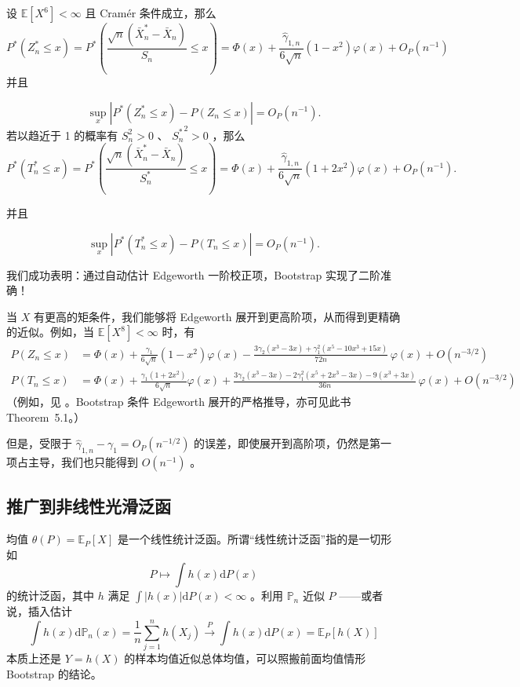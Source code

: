 \begin{theorem}\label{thm:ch11:second-order-accuracy}

设 $\mathbb E[X^6]<\infty$ 且 Cramér 条件成立，那么
\[P^*(Z_n^*\le x)=P^*\left(\frac{\sqrt n(\bar X_n^*-\bar X_n)}{S_n}\le x\right)=\Phi(x)+\frac{\widehat\gamma_{1,n}}{6\sqrt n}(1-x^2)\varphi(x)+O_P(n^{-1})\]
并且

\[
\sup_x \left| P^*(Z_n^*\leq x)-P(Z_n\leq x) \right| =O_P(n^{-1}).
\]
若以趋近于 1 的概率有 $S^2_n>0$ 、 ${S_n^*}^2>0$ ，那么
\[
P^*(T_n^*\le x)=P^*\left(\frac{\sqrt n(\bar X^*_n-\bar X_n)}{S^*_n}\le x\right)=\Phi(x)+\frac{\widehat\gamma_{1,n}}{6\sqrt n}(1+2x^2)\varphi(x)+O_P(n^{-1}).
\]

并且

\[
\sup_x \left| P^*(T_n^*\leq x)-P(T_n\leq x) \right| =O_P(n^{-1}).
\]

\end{theorem}
我们成功表明：通过自动估计 Edgeworth 一阶校正项，Bootstrap 实现了二阶准确！

当 $X$ 有更高的矩条件，我们能够将 Edgeworth 展开到更高阶项，从而得到更精确的近似。例如，当 $\mathbb E[X^8]<\infty$ 时，有
\[\begin{aligned} P(Z_n\le x) &= \Phi(x) + \frac{\gamma_1}{6\sqrt{n}}(1-x^2)\varphi(x) - \frac{3\gamma_2(x^3-3x)+\gamma_1^2(x^5-10x^3+15x)}{72n}\,\varphi(x) + O\!\left(n^{-3/2}\right)\\  P(T_n\le x)&= \Phi(x) + \frac{\gamma_1(1+2x^2)}{6\sqrt{n}}\varphi(x) + \frac{3\gamma_2(x^3-3x)-2\gamma_1^2(x^5+2x^3-3x)-9(x^3+3x)}{36n}\,\varphi(x) + O\!\left(n^{-3/2}\right) \end{aligned}\]
（例如，见 \cite[pp.~71--73]{hall1992}。Bootstrap 条件 Edgeworth 展开的严格推导，亦可见此书 Theorem~5.1。）

但是，受限于 $\widehat\gamma_{1,n}-\gamma_1=O_P(n^{-1/2})$ 的误差，即使展开到高阶项，仍然是第一项占主导，我们也只能得到 $O(n^{-1})$ 。

\subsection{推广到非线性光滑泛函}

均值 $\theta(P)=\mathbb E_P[X]$ 是一个线性统计泛函。所谓``线性统计泛函''指的是一切形如 
$$P\mapsto \int h(x)\mathrm dP(x)$$
的统计泛函，其中 $h$ 满足 $\textstyle\int|h(x)|\mathrm dP(x)<\infty$ 。利用 $\mathbb P_n$ 近似 $P$ ------或者说，插入估计
\[\int h(x)\mathrm d\mathbb P_n(x)=\frac1n\sum_{j=1}^nh(X_j)\overset{P}\to \int h(x)\mathrm{d}P(x)=\mathbb E_P[h(X)]\]
本质上还是 $Y=h(X)$ 的样本均值近似总体均值，可以照搬前面均值情形 Bootstrap 的结论。

